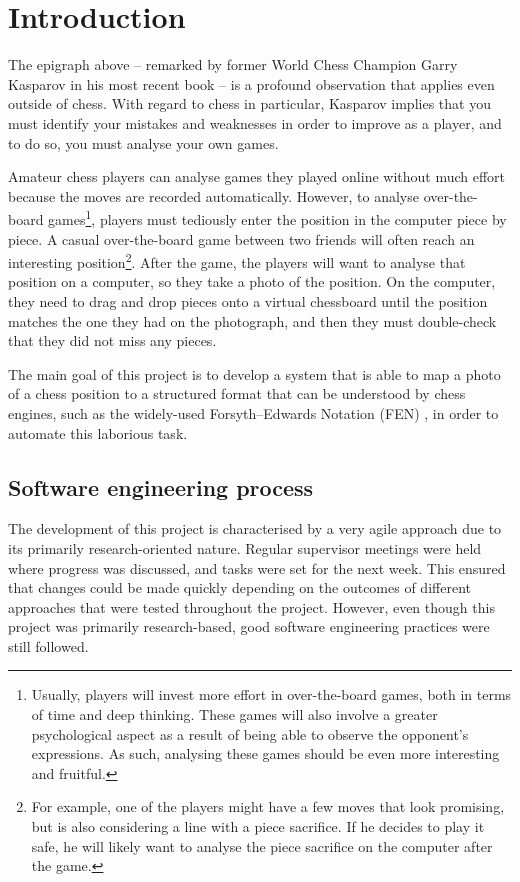 \documentclass[../main.tex]{subfiles}
\begin{document}
\chapter{Introduction}

The epigraph above -- remarked by former World Chess Champion Garry Kasparov in his most recent book \cite{kasparov2018} -- is a profound observation that applies even outside of chess.
With regard to chess in particular, Kasparov implies that you must identify your mistakes and weaknesses in order to improve as a player, and to do so, you must analyse your own games. 

Amateur chess players can analyse games they played online without much effort because the moves are recorded automatically.
However, to analyse over-the-board games\footnote{Usually, players will invest more effort in over-the-board games, both in terms of time and deep thinking. These games will also involve a greater psychological aspect as a result of being able to observe the opponent's expressions. As such, analysing these games should be even more interesting and fruitful.}, players must tediously enter the position in the computer piece by piece.
A casual over-the-board game between two friends will often reach an interesting position\footnote{For example, one of the players might have a few moves that look promising, but is also considering a line with a piece sacrifice. If he decides to play it safe, he will likely want to analyse the piece sacrifice on the computer after the game.}. 
After the game, the players will want to analyse that position on a computer, so they take a photo of the position. 
On the computer, they need to drag and drop pieces onto a virtual chessboard until the position matches the one they had on the photograph, and then they must double-check that they did not miss any pieces.

The main goal of this project is to develop a system that is able to map a photo of a chess position to a structured format that can be understood by chess engines, such as the widely-used Forsyth–Edwards Notation (FEN) \cite{edwards1994}, in order to automate this laborious task.






\section{Software engineering process}
The development of this project is characterised by a very agile approach due to its primarily research-oriented nature.
Regular supervisor meetings were held where progress was discussed, and tasks were set for the next week.
This ensured that changes could be made quickly depending on the outcomes of different approaches that were tested throughout the project.
However, even though this project was primarily research-based, good software engineering practices were still followed.
\end{document}

